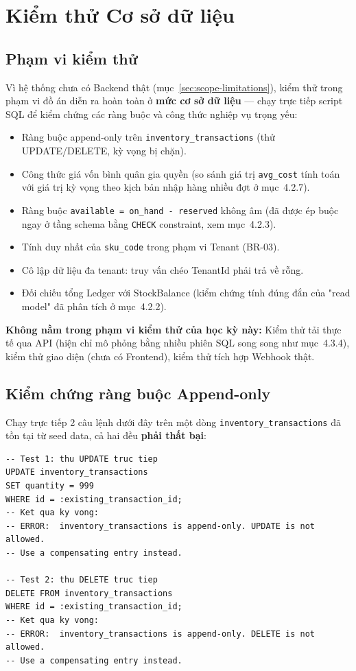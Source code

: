 \section{Kiểm thử Cơ sở dữ liệu}

\subsection{Phạm vi kiểm thử}
Vì hệ thống chưa có Backend thật (mục~\ref{sec:scope-limitations}), kiểm thử trong phạm vi đồ án diễn ra hoàn toàn ở \textbf{mức cơ sở dữ liệu} — chạy trực tiếp script SQL để kiểm chứng các ràng buộc và công thức nghiệp vụ trọng yếu:
\begin{itemize}
    \item Ràng buộc append-only trên \texttt{inventory\_transactions} (thử UPDATE/DELETE, kỳ vọng bị chặn).
    \item Công thức giá vốn bình quân gia quyền (so sánh giá trị \texttt{avg\_cost} tính toán với giá trị kỳ vọng theo kịch bản nhập hàng nhiều đợt ở mục~4.2.7).
    \item Ràng buộc \texttt{available = on\_hand - reserved} không âm (đã được ép buộc ngay ở tầng schema bằng \texttt{CHECK} constraint, xem mục~4.2.3).
    \item Tính duy nhất của \texttt{sku\_code} trong phạm vi Tenant (BR-03).
    \item Cô lập dữ liệu đa tenant: truy vấn chéo TenantId phải trả về rỗng.
    \item Đối chiếu tổng Ledger với StockBalance (kiểm chứng tính đúng đắn của "read model" đã phân tích ở mục~4.2.2).
\end{itemize}

\textbf{Không nằm trong phạm vi kiểm thử của học kỳ này:} Kiểm thử tải thực tế qua API (hiện chỉ mô phỏng bằng nhiều phiên SQL song song như mục~4.3.4), kiểm thử giao diện (chưa có Frontend), kiểm thử tích hợp Webhook thật.

\subsection{Kiểm chứng ràng buộc Append-only}
Chạy trực tiếp 2 câu lệnh dưới đây trên một dòng \texttt{inventory\_transactions} đã tồn tại từ seed data, cả hai đều \textbf{phải thất bại}:

\begin{lstlisting}
-- Test 1: thu UPDATE truc tiep
UPDATE inventory_transactions
SET quantity = 999
WHERE id = :existing_transaction_id;
-- Ket qua ky vong:
-- ERROR:  inventory_transactions is append-only. UPDATE is not allowed.
-- Use a compensating entry instead.

-- Test 2: thu DELETE truc tiep
DELETE FROM inventory_transactions
WHERE id = :existing_transaction_id;
-- Ket qua ky vong:
-- ERROR:  inventory_transactions is append-only. DELETE is not allowed.
-- Use a compensating entry instead.
\end{lstlisting}

